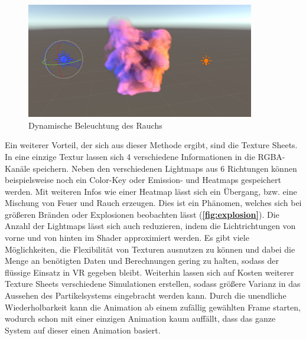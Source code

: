 \begin{figure}[h!]
	\centering
	\includegraphics[width=0.89\textwidth]{Grafiken/Implementation/litSmoke.png}
	\begin{footnotesize}
		\caption{Dynamische Beleuchtung des Rauchs}
		\label{fig:dynamicLightingSmoke}
	\end{footnotesize}
\end{figure}


Ein weiterer Vorteil, der sich aus dieser Methode ergibt, sind die Texture Sheets. In eine einzige Textur lassen sich 4 verschiedene Informationen in die
RGBA-Kanäle speichern. Neben den verschiedenen Lightmaps aus 6 Richtungen können beispielsweise noch ein Color-Key oder Emission- und Heatmaps gespeichert werden.
Mit weiteren Infos wie einer Heatmap lässt sich ein Übergang, bzw. eine Mischung von Feuer und Rauch erzeugen. Dies ist ein Phänomen, welches sich bei größeren Bränden
oder Explosionen beobachten lässt (\textbf{\autoref{fig:explosion}}).
Die Anzahl der Lightmaps lässt sich auch reduzieren, indem die Lichtrichtungen von vorne und von hinten im Shader approximiert werden.
Es gibt viele Möglichkeiten, die Flexibilität von Texturen ausnutzen zu können und dabei die Menge an benötigten Daten und Berechnungen gering zu halten,
sodass der flüssige Einsatz in VR gegeben bleibt. Weiterhin lassen sich auf Kosten weiterer Texture Sheets
verschiedene Simulationen erstellen, sodass größere Varianz in das Aussehen des Partikelsystems eingebracht werden kann.
Durch die unendliche Wiederholbarkeit kann die Animation ab einem zufällig gewählten Frame starten, wodurch schon mit einer einzigen Animation
kaum auffällt, dass das ganze System auf dieser einen Animation basiert.


